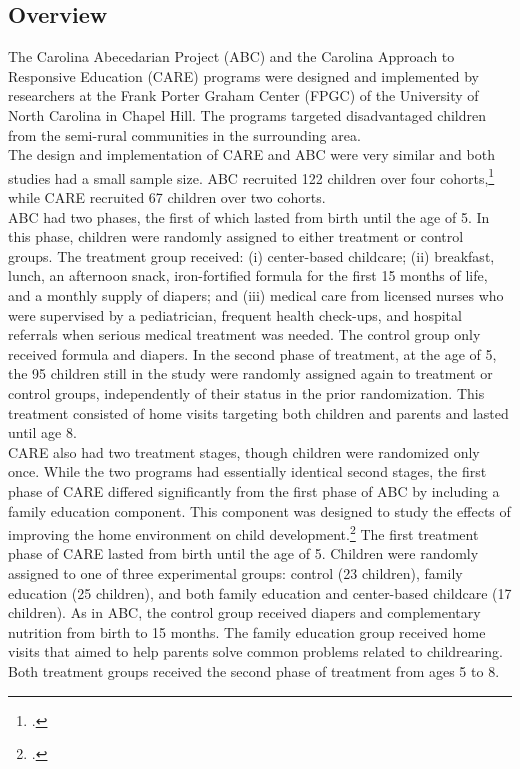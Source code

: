 \subsection{Overview}

\noindent The Carolina Abecedarian Project (ABC) and the Carolina Approach to Responsive Education (CARE) programs were designed and implemented by researchers at the Frank Porter Graham Center (FPGC) of the University of North Carolina in Chapel Hill. The programs targeted disadvantaged children from the semi-rural communities in the surrounding area.\\

\noindent The design and implementation of CARE and ABC were very similar and both studies had a small sample size. ABC recruited 122 children over four cohorts,\footnote{\citet{Ramey_Collier_etal_1976_CarolinaAbecedarianProject}.} while CARE recruited 67 children over two cohorts.\\  

\noindent ABC had two phases, the first of which lasted from birth until the age of 5. In this phase, children were randomly assigned to either treatment or control groups. The treatment group received: (i) center-based childcare; (ii) breakfast, lunch, an afternoon snack, iron-fortified formula for the first 15 months of life, and a monthly supply of diapers; and (iii) medical care from licensed nurses who were supervised by a pediatrician, frequent health check-ups, and hospital referrals when serious medical treatment was needed. The control group only received formula and diapers. In the second phase of treatment, at the age of 5, the 95 children still in the study were randomly assigned again to treatment or control groups, independently of their status in the prior randomization. This treatment consisted of home visits targeting both children and parents and lasted until age 8.\\ 

\noindent  CARE also had two treatment stages, though children were randomized only once. While the two programs had essentially identical second stages, the first phase of CARE differed significantly from the first phase of ABC by including a family education component. This component was designed to study the effects of improving the home environment on child development.\footnote{\citet{Wasik_Ramey_etal_1990_CD}.} The first treatment phase of CARE lasted from birth until the age of 5. Children were randomly assigned to one of three experimental groups: control (23 children), family education (25 children), and both family education and center-based childcare (17 children). As in ABC, the control group received diapers and complementary nutrition from birth to 15 months. The family education group received home visits that aimed to help parents solve common problems related to childrearing. Both treatment groups received the second phase of treatment from ages 5 to 8.\\

